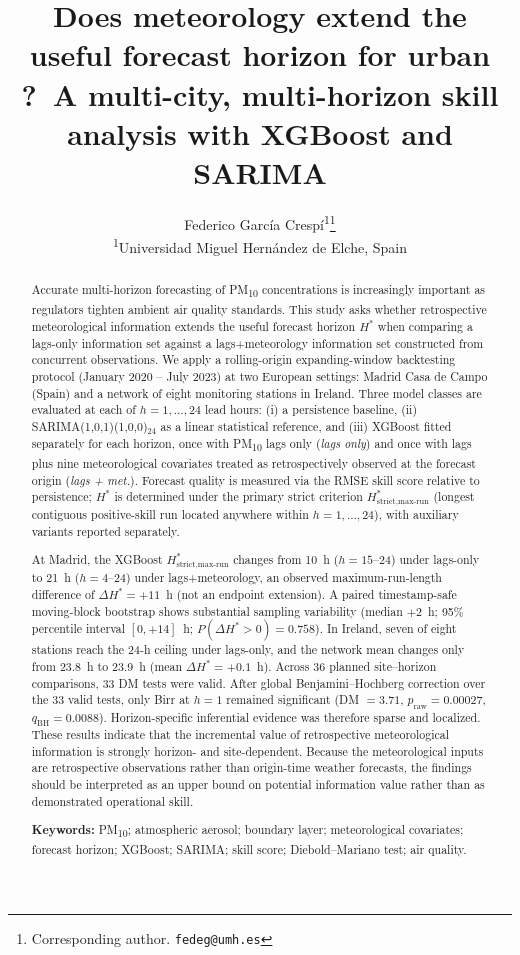 \documentclass[12pt,a4paper]{article}
\title{Does meteorology extend the useful forecast horizon for urban
\PMten{}?\
A multi-city, multi-horizon skill analysis with XGBoost and SARIMA}
\author{
  Federico García Crespí\textsuperscript{1}\thanks{Corresponding author.
    \texttt{fedeg@umh.es}} \\[6pt]
  \textsuperscript{1}Universidad Miguel Hernández de Elche, Spain
}
\date{}
\newcommand{\PMten}{PM\textsubscript{10}}
\begin{document}
\maketitle

\begin{abstract}
\noindent
Accurate multi-horizon forecasting of \PMten{} concentrations is increasingly
important as regulators tighten ambient air quality standards.  This study
asks whether retrospective meteorological information extends the useful
forecast horizon $H^*$ when comparing a lags-only information set against a
lags+meteorology information set constructed from concurrent
observations.  We apply a rolling-origin expanding-window backtesting protocol
(January 2020 -- July 2023) at two European settings: Madrid Casa de Campo
(Spain) and a network of eight monitoring stations in Ireland.  Three model
classes are evaluated at each of $h = 1, \ldots, 24$ lead hours: (i) a
persistence baseline, (ii) SARIMA(1,0,1)(1,0,0)$_{24}$ as a linear statistical
reference, and (iii) XGBoost fitted separately for each horizon, once with
\PMten{} lags only (\textit{lags only}) and once with lags plus nine
meteorological covariates treated as retrospectively observed at the forecast
origin (\textit{lags + met.}).  Forecast quality is measured via the RMSE skill
score relative to persistence; $H^*$ is determined under the primary strict
criterion $H^*_{\text{strict,max-run}}$ (longest contiguous positive-skill run
located anywhere within $h = 1, \ldots, 24$), with auxiliary variants reported
separately.

At Madrid, the XGBoost $H^*_{\text{strict,max-run}}$ changes from 10~h
($h=15$--24) under lags-only to 21~h ($h=4$--24) under lags+meteorology, an
observed maximum-run-length difference of $\Delta H^*=+11$~h (not an endpoint
extension).  A paired timestamp-safe moving-block bootstrap shows substantial
sampling variability (median $+2$~h; 95\% percentile interval $[0,+14]$~h;
$P(\Delta H^*>0)=0.758$).  In Ireland, seven of eight stations reach the 24-h
ceiling under lags-only, and the network mean changes only from 23.8~h to
23.9~h (mean $\Delta H^*=+0.1$~h).  Across 36 planned site--horizon comparisons, 33 DM tests were valid.
After global Benjamini--Hochberg correction over the 33 valid tests, only
Birr at $h=1$ remained significant
(DM $=3.71$, $p_{\mathrm{raw}}=0.00027$,
$q_{\mathrm{BH}}=0.0088$).
Horizon-specific inferential evidence was therefore sparse and localized.
These results indicate that the incremental value of
retrospective meteorological information is strongly horizon- and
site-dependent.  Because the meteorological inputs are retrospective
observations rather than origin-time weather forecasts, the findings should be
interpreted as an upper bound on potential information value rather than as
demonstrated operational skill.

\medskip
\noindent
\textbf{Keywords:} PM\textsubscript{10}; atmospheric aerosol; boundary layer;
meteorological covariates; forecast horizon; XGBoost; SARIMA; skill score;
Diebold--Mariano test; air quality.
\end{abstract}
\end{document}
